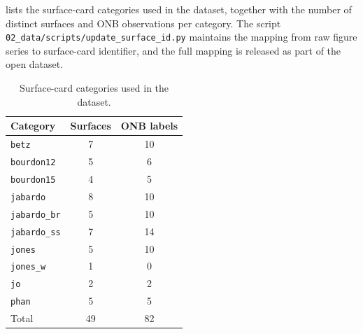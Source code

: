 \documentclass[11pt, a4paper]{article}
\begin{document}
 lists the surface-card categories
used in the dataset, together with the number of distinct surfaces and
ONB observations per category. The script
\verb|02_data/scripts/update_surface_id.py| maintains the mapping from
raw figure series to surface-card identifier, and the full mapping is
released as part of the open dataset.

\begin{table}[ht]
\centering
\caption{Surface-card categories used in the dataset.}
\label{tab:supp_surface_inventory}
\small
\begin{tabular}{lcc}
\toprule
Category & Surfaces & ONB labels \\
\midrule
\texttt{betz}        &  7 & 10 \\
\texttt{bourdon12}   &  5 &  6 \\
\texttt{bourdon15}   &  4 &  5 \\
\texttt{jabardo}     &  8 & 10 \\
\texttt{jabardo\_br} &  5 & 10 \\
\texttt{jabardo\_ss} &  7 & 14 \\
\texttt{jones}       &  5 & 10 \\
\texttt{jones\_w}    &  1 &  0 \\
\texttt{jo}          &  2 &  2 \\
\texttt{phan}        &  5 &  5 \\
\midrule
Total                & 49 & 82 \\
\bottomrule
\end{tabular}
\end{table}
\end{document}
